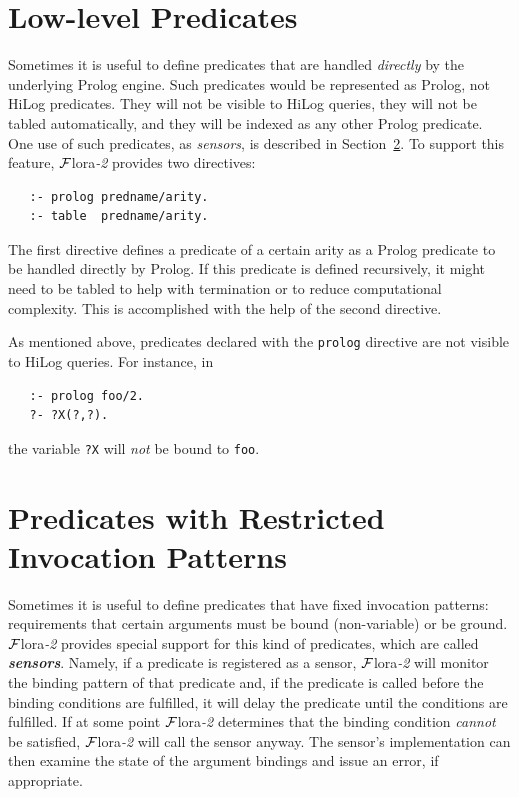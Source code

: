 \documentclass[11pt]{article}
\newcommand{\FLORA}{{\mbox{\sc ${\cal F}${lora}\rm\emph{-2}}}\xspace}
\begin{document}
\section{Low-level Predicates}

Sometimes it is useful to define predicates that are handled
\emph{directly} by the underlying Prolog engine. Such predicates would be
represented as Prolog, not HiLog predicates. They will not be visible to
HiLog queries, they will not be tabled automatically,
and they will be indexed as any other Prolog predicate.
One use of such predicates, as \emph{sensors}, is described in
Section~\ref{sec-sensor}.
To support this feature, \FLORA provides two directives:
\begin{verbatim}
   :- prolog predname/arity.
   :- table  predname/arity.
\end{verbatim}
The first directive defines a predicate of a certain arity as a Prolog
predicate to be handled directly by Prolog. If this predicate is defined
recursively, it might need to be tabled to help with termination or to
reduce computational complexity. This is accomplished with the help of the
second directive.

As mentioned above, predicates declared with the \texttt{prolog} directive
are not visible to HiLog queries. For instance, in
\begin{verbatim}
   :- prolog foo/2.
   ?- ?X(?,?).
\end{verbatim}
the variable \texttt{?X} will \emph{not} be bound to \texttt{foo}.  


\section{Predicates with Restricted Invocation Patterns}\label{sec-sensor}

Sometimes it is useful to define predicates that have fixed
invocation patterns: requirements that certain arguments must be
bound (non-variable) or be ground.
\FLORA provides special support for this kind of predicates, which are
called \textbf{\emph{sensors}}. Namely, if a predicate is registered as a sensor,
\FLORA will monitor the binding pattern of that predicate and, if the
predicate is called before the binding conditions are fulfilled, it will
delay the predicate until the conditions
are fulfilled. If  at some point \FLORA determines that
the binding condition \emph{cannot} be satisfied, \FLORA will call the sensor
anyway. The sensor's implementation
can then examine the state of the argument bindings and
issue an error, if appropriate.
\end{document}
